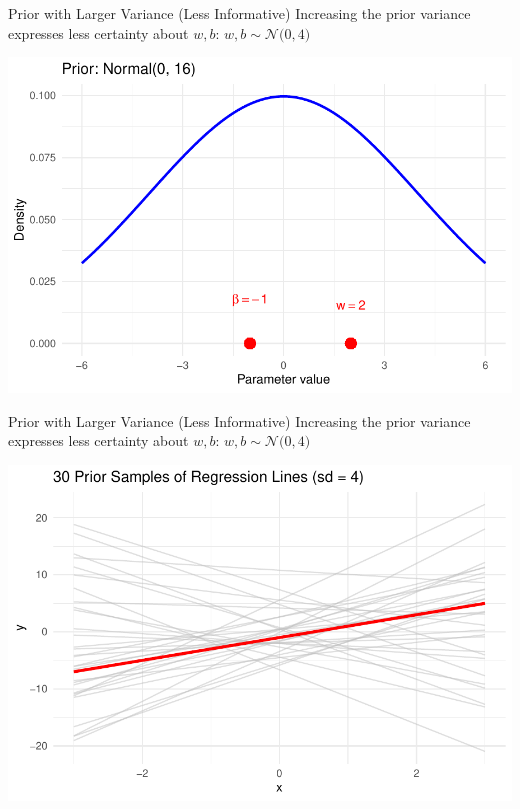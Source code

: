 \documentclass{beamer}
\begin{document}
\begin{frame}{Prior with Larger Variance (Less Informative)}
  Increasing the prior variance expresses less certainty about \(w, b\):
  \(
    w, b \sim \mathcal{N}\big(0, 4\big)
  \)

  \begin{center}
    \includegraphics[width=0.8\linewidth]{prior_1_2.pdf}
  \end{center}
\end{frame}

\begin{frame}{Prior with Larger Variance (Less Informative)}
  Increasing the prior variance expresses less certainty about \(w, b\):
  \(
    w, b \sim \mathcal{N}\big(0, 4\big)
  \)

  \begin{center}
    \includegraphics[width=0.8\linewidth]{prior_2_2.pdf}
  \end{center}
\end{frame}
\end{document}
